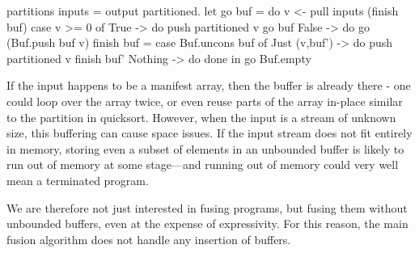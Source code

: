\begin{code}
partitions inputs =
 output partitioned.
 let go buf = do
       v <- pull inputs (finish buf)
       case v >= 0 of
        True -> do
         push partitioned v
         go buf
        False -> do
         go (Buf.push buf v)
     finish buf = case Buf.uncons buf of
       Just (v,buf') -> do
         push partitioned v
         finish buf'
       Nothing -> do
         done
 in  go Buf.empty
\end{code}

If the input happens to be a manifest array, then the buffer is already there - one could loop over the array twice, or even reuse parts of the array in-place similar to the partition in quicksort.
However, when the input is a stream of unknown size, this buffering can cause space issues.
If the input stream does not fit entirely in memory, storing even a subset of elements in an unbounded buffer is likely to run out of memory at some stage---and running out of memory could very well mean a terminated program.

We are therefore not just interested in fusing programs, but fusing them without unbounded buffers, even at the expense of expressivity.
For this reason, the main fusion algorithm does not handle any insertion of buffers.

